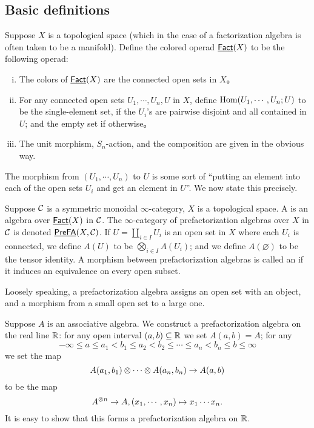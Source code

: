 \documentclass[twoside]{article}
\begin{document}
\subsection{Basic definitions}

\begin{definition}
    Suppose $X$ is a topological space (which in the case of a factorization
    algebra is often taken to be a manifold). Define the colored operad
    $\underline{\smash{\mathsf{Fact}}}(X)$ to be the following operad:
    \begin{enumerate}[i)]
        \item The colors of $\underline{\smash{\mathsf{Fact}}}(X)$ are the connected open sets in $X$。
        
        \item For any connected open sets $U_1,\cdots,U_n,U$ in $X$,
        define $\operatorname{Hom}(U_1,\cdots,U_n;U)$ to be the single-element set, if
        the $U_i$'s are pairwise disjoint and all contained in $U$;
        and the empty set if otherwise。

        \item The unit morphism, $S_n$-action, and the composition are given in the
        obvious way.
    \end{enumerate}
\end{definition}

The morphism from $(U_1,\cdots,U_n)$ to $U$ is some sort of ``putting an element
into each of the open sets $U_i$ and get an element in $U$''. We now state this
precisely.

\begin{definition}
    Suppose $\cal C$ is a symmetric monoidal $\infty$-category, $X$ is a
    topological space. A  is an algebra over $\underline{\smash{\mathsf{Fact}}}(X)$ in $\cal C$. The $\infty$-category of 
    prefactorization algebras over $X$ in $\cal C$ is denoted $\underline{\smash{\mathsf{PreFA}}}(X,\cal C)$.
    If $U=\coprod_{i\in I}U_i$ is an open set in $X$ where each $U_i$ is connected,
    we define $A(U)$ to be $\bigotimes_{i\in I}A(U_i)$; and we define 
    $A(\varnothing)$ to be the tensor identity. A morphism between 
    prefactorization algebras is called an  if it induces
    an equivalence on every open subset.
\end{definition}

Loosely speaking, a prefactorization algebra assigns an open set with an object,
and a morphism from a small open set to a large one. 

\begin{example}
    Suppose $A$ is an associative algebra. We construct a prefactorization algebra
    on the real line $\mathbb{R}$: for any open interval $(a,b)\subseteq\mathbb{R}$ we set 
    $A(a,b)=A$; for any \[-\infty\le a\le a_1<b_1\le a_2<b_2\le\cdots\le a_n<b_n\le b
    \le\infty\] we set the map \[A(a_1,b_1)\otimes\cdots\otimes A(a_n,b_n)\to A(a,b)\]
    to be the map \[A^{\otimes n}\to A,(x_1,\cdots,x_n)\mapsto x_1\cdots x_n.\]
    It is easy to show that this forms a prefactorization algebra on $\mathbb{R}$.
\end{example}
    
\end{document}
